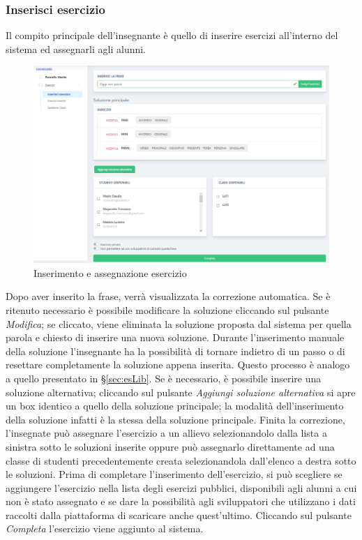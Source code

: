         \subsubsection{Inserisci esercizio}
          Il compito principale dell'insegnante è quello di inserire esercizi all'interno del sistema ed assegnarli agli alunni.
        	\begin{figure}[H]
            	\centering
        		\includegraphics[width=17cm]{sez/img/insegnante/inserisciEsercizio.PNG} 
            	\caption{Inserimento e assegnazione esercizio}\label{fig:1}
        	\end{figure}
        
          Dopo aver inserito la frase, verrà visualizzata la correzione automatica. Se è ritenuto necessario è possibile modificare la soluzione cliccando sul pulsante \textit{Modifica}; se cliccato, viene eliminata la soluzione proposta dal sistema per quella parola e chiesto di inserire una nuova soluzione. Durante l'inserimento manuale della soluzione l'insegnante ha la possibilità di tornare indietro di un passo o di resettare completamente la soluzione appena inserita. Questo processo è analogo a quello presentato in \S\ref{sec:esLib}. 
          Se è necessario, è possibile inserire una soluzione alternativa; cliccando sul pulsante \textit{Aggiungi soluzione alternativa} si apre un box identico a quello della soluzione principale; la modalità dell'inserimento della soluzione infatti è la stessa della soluzione principale.  \linebreak \linebreak Finita la correzione, l'insegnate può assegnare l'esercizio a un allievo selezionandolo dalla lista a sinistra sotto le soluzioni inserite oppure può assegnarlo direttamente ad una classe di studenti precedentemente creata selezionandola dall'elenco a destra sotto le soluzioni. \linebreak \linebreak
          Prima di completare l'inserimento dell'esercizio, si può scegliere se aggiungere l'esercizio nella lista degli esercizi pubblici, disponibili agli alunni a cui non è stato assegnato e se dare la possibilità agli sviluppatori che utilizzano i dati raccolti dalla piattaforma di scaricare anche quest'ultimo. \linebr  Cliccando sul pulsante \textit{Completa} l'esercizio viene aggiunto al sistema.
          
